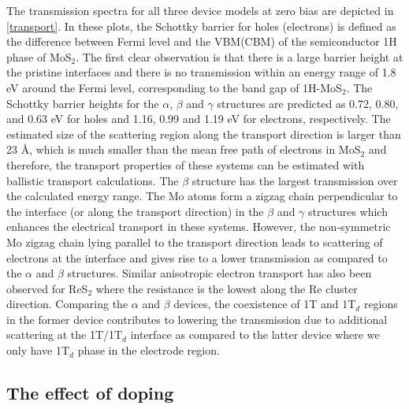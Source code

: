 The transmission spectra for all three  device models at zero bias are depicted in \autoref{transport}. In these plots, the Schottky barrier for holes (electrons) is defined as the difference between Fermi level and the VBM(CBM) of the semiconductor 1H phase of MoS$_2$. The first clear observation is that there is a large barrier height at the pristine interfaces and there is no transmission within an energy range of 1.8 eV around the Fermi level, corresponding to the band gap of 1H-MoS$_2$. The Schottky barrier heights for the $\alpha$, $\beta$ and $\gamma$ structures are predicted as 0.72,  0.80, and 0.63 eV for holes and 1.16, 0.99 and 1.19 eV for electrons, respectively. The estimated size of the scattering region along the transport direction is larger than 23 {\AA}, which is much smaller than the mean free path of electrons in MoS$_2$\cite{mos2-trans} and therefore, the transport properties of these systems can be estimated with ballistic transport calculations. The $\beta$ structure has the largest transmission over the calculated energy range. The Mo atoms form a zigzag chain perpendicular to the interface (or along the transport direction) in the $\beta$ and $\gamma$ structures which enhances the electrical transport in these systems. However, the non-symmetric Mo zigzag chain lying parallel  to the transport direction leads to scattering of electrons at the interface and gives rise to a lower transmission as compared to the $\alpha$ and $\beta$ structures. Similar anisotropic electron transport has also been  observed for ReS$_2$ where the resistance is the lowest along the Re cluster direction\cite{doi:10.1021/acsnano.5b04851}. Comparing  the $\alpha$ and $\beta$ devices,  the coexistence of 1T and 1T$_d$ regions in the former device contributes to lowering the transmission due to additional scattering at the 1T/1T$_d$ interface as compared to the latter device where we only have 1T$_d$ phase in the electrode region.

\subsection{The effect of doping}

